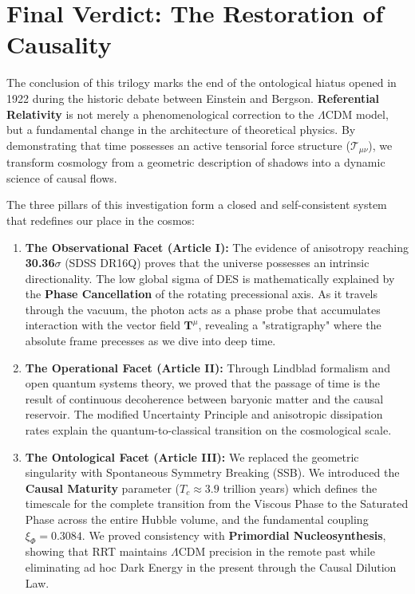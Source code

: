 \documentclass[12pt, a4paper]{article}
\begin{document}
\section{Final Verdict: The Restoration of Causality}

The conclusion of this trilogy marks the end of the ontological hiatus opened in 1922 during the historic debate between Einstein and Bergson. \textbf{Referential Relativity} is not merely a phenomenological correction to the \(\Lambda\)CDM model, but a fundamental change in the architecture of theoretical physics. By demonstrating that time possesses an active tensorial force structure ($\mathcal{T}_{\mu\nu}$), we transform cosmology from a geometric description of shadows into a dynamic science of causal flows.

The three pillars of this investigation form a closed and self-consistent system that redefines our place in the cosmos:
\begin{enumerate}
   \item \textbf{The Observational Facet (Article I):} The evidence of anisotropy reaching \textbf{30.36$\sigma$} (SDSS DR16Q) proves that the universe possesses an intrinsic directionality. The low global sigma of DES is mathematically explained by the \textbf{Phase Cancellation} of the rotating precessional axis. As it travels through the vacuum, the photon acts as a phase probe that accumulates interaction with the vector field $\mathbf{T}^\mu$, revealing a "stratigraphy" where the absolute frame precesses as we dive into deep time.
    \item \textbf{The Operational Facet (Article II):} Through Lindblad formalism and open quantum systems theory, we proved that the passage of time is the result of continuous decoherence between baryonic matter and the causal reservoir. The modified Uncertainty Principle and anisotropic dissipation rates explain the quantum-to-classical transition on the cosmological scale.
    \item \textbf{The Ontological Facet (Article III):} We replaced the geometric singularity with Spontaneous Symmetry Breaking (SSB). We introduced the \textbf{Causal Maturity} parameter ($T_c \approx 3.9$ trillion years) which defines the timescale for the complete transition from the Viscous Phase to the Saturated Phase across the entire Hubble volume, and the fundamental coupling $\xi_\Phi = 0.3084$. We proved consistency with \textbf{Primordial Nucleosynthesis}, showing that RRT maintains \(\Lambda\)CDM precision in the remote past while eliminating ad hoc Dark Energy in the present through the Causal Dilution Law.
\end{enumerate}
\end{document}
